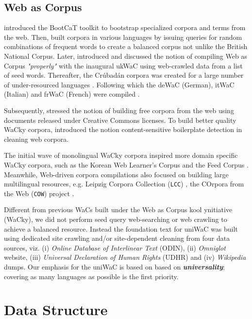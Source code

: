 \documentclass[11pt]{article}
\begin{document}
\subsection{Web as Corpus}

 introduced the BootCaT toolkit to bootstrap specialized corpora and terms from the web. Then,  built corpora in various languages by issuing queries for random combinations of frequent words to create a balanced corpus not unlike the British National Corpus. Later,  introduced and discussed the notion of compiling Web as Corpus \emph{"properly"} with the inaugural ukWaC using web-crawled data from a list of seed words. Thereafter, the Crúbadán corpora was created for a large number of under-resourced languages \cite{scannell2007crubadan}. Following which the deWaC (German), itWaC (Italian) and frWaC (French) were compiled \cite{baroni2009wacky}. 

Subsequently,  stressed the notion of building free corpora from the web using documents released under Creative Commons licenses. To build better quality WaCky corpora,  introduced the notion content-sensitive boilerplate detection in cleaning web corpora. 

The initial wave of monolingual WaCky corpora \cite{baroni2008wacky} inspired more domain specific WaCky corpora, such as the Korean Web Learner's Corpus \cite{dickinson2010korean} and the Feed Corpus \cite{minocha2013feed}. Meanwhile, Web-driven corpora compilations also focused on building large  multilingual resources, e.g. Leipzig Corpora Collection (\texttt{LCC}) \cite{biemann2007leipzig}, the COrpora from the Web (\texttt{COW}) project \cite{schaefer2012cow}.

Different from previous WaCs built under the Web as Corpus kool ynitiative (WaCky), we did not perform seed query web-searching or web crawling to achieve a balanced resource. Instead the foundation text for uniWaC was built using dedicated site crawling and/or site-dependent cleaning from four data sources, viz. (i) \emph{Online Database of Interlinear Text} (ODIN), (ii) \emph{Omniglot} website, (iii) \emph{Universal Declaration of Human Rights} (UDHR) and (iv) \emph{Wikipedia} dumps. Our emphasis for the uniWaC is based on based on \textbf{\emph{universality}}; covering as many languages as possible is the first priority.



\section{Data Structure}
\end{document}
